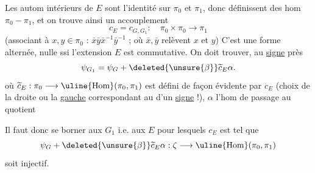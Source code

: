 
Les autom intérieurs de $E$ sont l'identité sur
$\pi_0$ et $\pi_1$, donc définissent des hom $\pi_0-\pi_1$,
et on trouve ainsi un accouplement
\[
c_E=c_{G,G_1}:\quad\pi_0\times\pi_0\longrightarrow\pi_1
\]
(associant à $x,y\in\pi_0$ : $\bar{x}\bar{y}\bar{x}^{-1}\bar{y}^{-1}$ ; où $\bar{x},\bar{y}$ relèvent
$x$ et $y$) C'est une forme alternée, nulle ssi
l'extension $E$ est commutative. On doit
trouver, au \uline{signe} près
\[
\psi_{G_1}=\psi_G+\deleted{\unsure{\beta}}\widetilde c_E\alpha.
\]
où $\widetilde c_E:\pi_0\longrightarrow\uline{\operatorname{Hom}}(\pi_0,\pi_1)$ est défini de façon
évidente par $c_E$ (choix de la droite ou la \uline{gauche}
correspondant au  d'un \uline{signe} !), $\alpha$
l'hom de passage au quotient

Il faut donc
se borner aux $G_1$ i.e. aux $E$ pour lesquels
$c_E$ est tel que
\[
\psi_G+\deleted{\unsure{\beta}}\widetilde c_E\alpha:\zeta\longrightarrow\uline{\operatorname{Hom}}(\pi_0,\pi_1)
\]
soit injectif.


